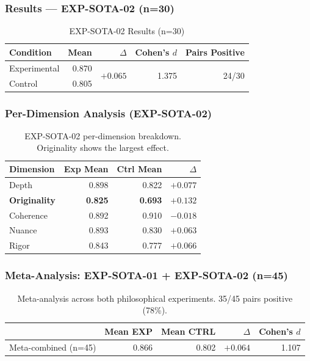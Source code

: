 \documentclass[12pt, a4paper]{article}
\begin{document}
\subsubsection{Results — EXP-SOTA-02 (n=30)}
\begin{table}[h]
\centering
\begin{tabular}{lrrrr}
\toprule
Condition & Mean & $\Delta$ & Cohen's $d$ & Pairs Positive \\
\midrule
Experimental & 0.870 & \multirow{2}{*}{$+0.065$} & \multirow{2}{*}{1.375} & \multirow{2}{*}{24/30} \\
Control & 0.805 & & & \\
\bottomrule
\end{tabular}
\caption{EXP-SOTA-02 Results (n=30)}
\end{table}

\subsubsection{Per-Dimension Analysis (EXP-SOTA-02)}
\begin{table}[h]
\centering
\begin{tabular}{lrrr}
\toprule
Dimension & Exp Mean & Ctrl Mean & $\Delta$ \\
\midrule
Depth & 0.898 & 0.822 & $+0.077$ \\
\textbf{Originality} & \textbf{0.825} & \textbf{0.693} & $\mathbf{+0.132}$ \\
Coherence & 0.892 & 0.910 & $-0.018$ \\
Nuance & 0.893 & 0.830 & $+0.063$ \\
Rigor & 0.843 & 0.777 & $+0.066$ \\
\bottomrule
\end{tabular}
\caption{EXP-SOTA-02 per-dimension breakdown. Originality shows the largest effect.}
\end{table}

\subsubsection{Meta-Analysis: EXP-SOTA-01 + EXP-SOTA-02 (n=45)}
\begin{table}[h]
\centering
\begin{tabular}{lrrrr}
\toprule
 & Mean EXP & Mean CTRL & $\Delta$ & Cohen's $d$ \\
\midrule
Meta-combined (n=45) & 0.866 & 0.802 & $+0.064$ & 1.107 \\
\bottomrule
\end{tabular}
\caption{Meta-analysis across both philosophical experiments. 35/45 pairs positive (78\%).}
\end{table}
\end{document}
